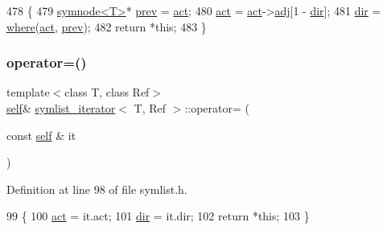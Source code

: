 \begin{DoxyCode}
478 \{
479     \mbox{\hyperlink{structsymnode}{symnode<T>}}* \mbox{\hyperlink{structsymlist__iterator_a30f1c0a962713ded0c24871093089fb0}{prev}} = \mbox{\hyperlink{structsymlist__iterator_a1c7a0193ab85baa7705070975d841fc8}{act}};
480     \mbox{\hyperlink{structsymlist__iterator_a1c7a0193ab85baa7705070975d841fc8}{act}} = \mbox{\hyperlink{structsymlist__iterator_a1c7a0193ab85baa7705070975d841fc8}{act}}->\mbox{\hyperlink{structsymnode_aba7e8f525fb4d85417384a6ccff59241}{adj}}[1 - \mbox{\hyperlink{structsymlist__iterator_a8433e558ceb6b17b225414ef46b4a3e2}{dir}}];
481     \mbox{\hyperlink{structsymlist__iterator_a8433e558ceb6b17b225414ef46b4a3e2}{dir}} = \mbox{\hyperlink{structsymlist__iterator_a260b63ae284e3f07ae510105c7edd6a0}{where}}(\mbox{\hyperlink{structsymlist__iterator_a1c7a0193ab85baa7705070975d841fc8}{act}}, \mbox{\hyperlink{structsymlist__iterator_a30f1c0a962713ded0c24871093089fb0}{prev}}); 
482     \textcolor{keywordflow}{return} *\textcolor{keyword}{this};
483 \}
\end{DoxyCode}
\mbox{\label{structsymlist__iterator_a06f2e1a93beb87afd09795b7f3898bdd}} 
\subsubsection{\texorpdfstring{operator=()}{operator=()}}
{\footnotesize\ttfamily template$<$class T, class Ref$>$ \\
\mbox{\hyperlink{structsymlist__iterator_ae1426e0085d4c88445c0a84675ee7d38}{self}}\& \mbox{\hyperlink{structsymlist__iterator}{symlist\+\_\+iterator}}$<$ T, Ref $>$\+::operator= (\begin{DoxyParamCaption}\item[{const \mbox{\hyperlink{structsymlist__iterator_ae1426e0085d4c88445c0a84675ee7d38}{self}} \&}]{it }\end{DoxyParamCaption})\hspace{0.3cm}{\ttfamily [inline]}}



Definition at line 98 of file symlist.\+h.


\begin{DoxyCode}
99     \{
100     \mbox{\hyperlink{structsymlist__iterator_a1c7a0193ab85baa7705070975d841fc8}{act}} = it.act;
101     \mbox{\hyperlink{structsymlist__iterator_a8433e558ceb6b17b225414ef46b4a3e2}{dir}} = it.dir;
102     \textcolor{keywordflow}{return} *\textcolor{keyword}{this};
103     \}
\end{DoxyCode}
\mbox{\label{structsymlist__iterator_ace4bd4255b49937b7ee77d2f726ccf0b}} 
